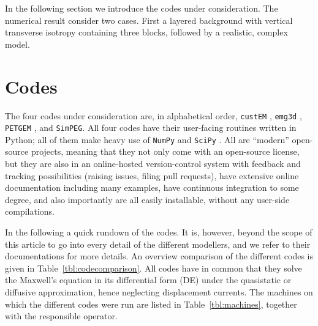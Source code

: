 \documentclass[
    paper,
  ]{geophysics}
\newcommand{\emg}[2]{\texttt{emg#1#2}\xspace}
\newcommand{\simpeg}{\texttt{SimPEG}\xspace}
\newcommand{\custem}{\texttt{custEM}\xspace}
\newcommand{\petgem}{\texttt{PETGEM}\xspace}
\begin{document}
In the following section we introduce the codes under consideration. The
numerical result consider two cases. First a layered background with vertical
transverse isotropy containing three blocks, followed by a realistic, complex
model.

\clearpage  %
\section{Codes}

The four codes under consideration are, in alphabetical order, \custem
\citep{GEO.19.Rochlitz}, \emg3d \citep{JOSS.19.Werthmuller}, \petgem
\citep{GJI.19.CastilloReyes}, and \simpeg \citep{CAG.15.Cockett}. All four
codes have their user-facing routines written in Python; all of them make heavy
use of \texttt{NumPy} \citep{CSE.11.VanDerWalt} and \texttt{SciPy}
\citep{NM.20.Virtanen}. All are “modern” open-source projects, meaning that
they not only come with an open-source license, but they are also in an
online-hosted version-control system with feedback and tracking possibilities
(raising issues, filing pull requests), have extensive online documentation
including many examples, have continuous integration to some degree, and also
importantly are all easily installable, without any user-side compilations.

In the following a quick rundown of the codes. It is, however, beyond the scope
of this article to go into every detail of the different modellers, and we
refer to their documentations for more details. An overview comparison of the
different codes is given in Table~\ref{tbl:codecomparison}. All codes have in
common that they solve the Maxwell's equation in its differential form (DE)
under the quasistatic or diffusive approximation, hence neglecting displacement
currents. The machines on which the different codes were run are listed in
Table~\ref{tbl:machines}, together with the responsible operator.
\end{document}
